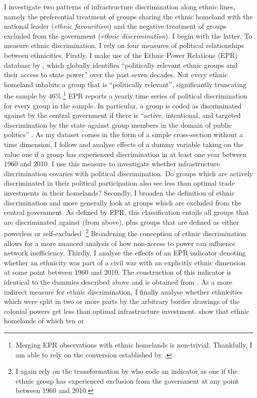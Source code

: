 \documentclass[11pt, oneside]{article}   	%
\begin{document}
I investigate two patterns of infrastructure discrimination along ethnic lines, namely the preferential treatment of groups sharing the ethnic homeland with the national leader (\emph{ethnic favouritism}) and the negative treatment of groups excluded from the government (\emph{ethnic discrimination}). I begin with the latter. To measure ethnic discrimination, I rely on four measures of political relationships between ethnicities. Firstly, I make use of the Ethnic Power Relations (EPR) database by \cite{Vogt_IntegratingDataEthnicity_2015}, which globally identifies ``politically relevant ethnic groups and their access to state power'' \citep[p. 1328]{Vogt_IntegratingDataEthnicity_2015} over the past seven decades. Not every ethnic homeland inhabits a group that is ``politically relevant'', significantly truncating the sample by 46\%.\footnote{Merging EPR observations with ethnic homelands is non-trivial. Thankfully, I am able to rely on the conversion established by \cite{Michalopoulos_LongRunEffectsScramble_2016}.} EPR reports a yearly time series of political discrimination for every group in the sample. In particular, a group is coded as discriminated against by the central government if there is ``active, intentional, and targeted discrimination by the state against group members in the domain of public politics'' \citep[p. 1331]{Vogt_IntegratingDataEthnicity_2015}. As my dataset comes in the form of a simple cross-section without a time dimension, I follow \cite{Michalopoulos_LongRunEffectsScramble_2016} and analyse effects of a dummy variable taking on the value one if a group has experienced discrimination in at least one year between 1960 and 2010. I use this measure to investigate whether infrastructure discrimination covaries with political discrimination. Do groups which are actively discriminated in their political participation also see less than optimal trade investments in their homelands? Secondly, I broaden the definition of ethnic discrimination and more generally look at groups which are excluded from the central government. As defined by EPR, this classification entails all groups that are discriminated against (from above), plus groups that are defined as either powerless or self-excluded \citep[p. 1331]{Vogt_IntegratingDataEthnicity_2015}.\footnote{I again rely on the transformation by \cite{Michalopoulos_LongRunEffectsScramble_2016} who code an indicator as one if the ethnic group has experienced exclusion from the government at any point between 1960 and 2010.} Broadening the conception of ethnic discrimination allows for a more nuanced analysis of how non-access to power can influence network inefficiency. Thirdly, I analyse the effects of an EPR indicator denoting whether an ethnicity was part of a civil war with an explicitly ethnic dimension at some point between 1960 and 2010. The construction of this indicator is identical to the dummies described above and is obtained from \cite{Michalopoulos_LongRunEffectsScramble_2016}. As a more indirect measure for ethnic discrimination, I finally analyse whether ethnicities which were split in two or more parts by the arbitrary border drawings of the colonial powers get less than optimal infrastructure investment. \cite{Michalopoulos_LongRunEffectsScramble_2016} show that ethnic homelands of which ten or 
\end{document}
